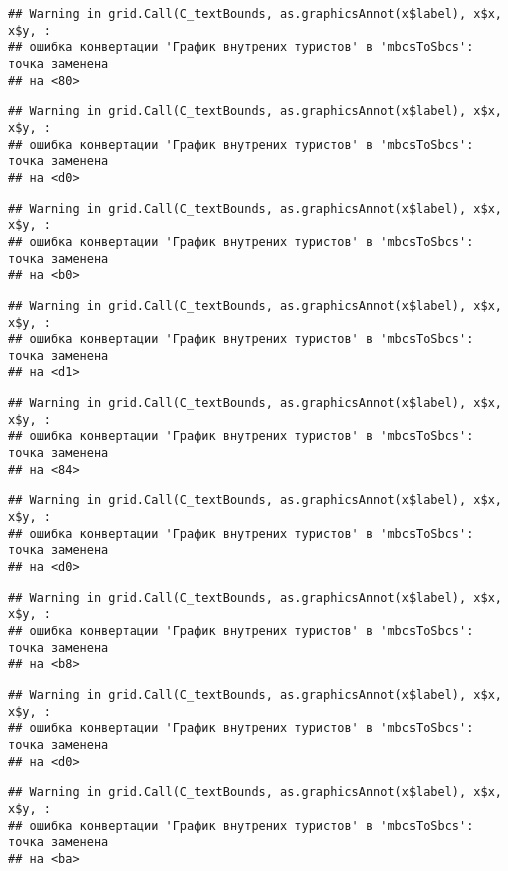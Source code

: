 \documentclass[
]{article}
\begin{document}
\begin{verbatim}
## Warning in grid.Call(C_textBounds, as.graphicsAnnot(x$label), x$x, x$y, :
## ошибка конвертации 'График внутрених туристов' в 'mbcsToSbcs': точка заменена
## на <80>
\end{verbatim}

\begin{verbatim}
## Warning in grid.Call(C_textBounds, as.graphicsAnnot(x$label), x$x, x$y, :
## ошибка конвертации 'График внутрених туристов' в 'mbcsToSbcs': точка заменена
## на <d0>
\end{verbatim}

\begin{verbatim}
## Warning in grid.Call(C_textBounds, as.graphicsAnnot(x$label), x$x, x$y, :
## ошибка конвертации 'График внутрених туристов' в 'mbcsToSbcs': точка заменена
## на <b0>
\end{verbatim}

\begin{verbatim}
## Warning in grid.Call(C_textBounds, as.graphicsAnnot(x$label), x$x, x$y, :
## ошибка конвертации 'График внутрених туристов' в 'mbcsToSbcs': точка заменена
## на <d1>
\end{verbatim}

\begin{verbatim}
## Warning in grid.Call(C_textBounds, as.graphicsAnnot(x$label), x$x, x$y, :
## ошибка конвертации 'График внутрених туристов' в 'mbcsToSbcs': точка заменена
## на <84>
\end{verbatim}

\begin{verbatim}
## Warning in grid.Call(C_textBounds, as.graphicsAnnot(x$label), x$x, x$y, :
## ошибка конвертации 'График внутрених туристов' в 'mbcsToSbcs': точка заменена
## на <d0>
\end{verbatim}

\begin{verbatim}
## Warning in grid.Call(C_textBounds, as.graphicsAnnot(x$label), x$x, x$y, :
## ошибка конвертации 'График внутрених туристов' в 'mbcsToSbcs': точка заменена
## на <b8>
\end{verbatim}

\begin{verbatim}
## Warning in grid.Call(C_textBounds, as.graphicsAnnot(x$label), x$x, x$y, :
## ошибка конвертации 'График внутрених туристов' в 'mbcsToSbcs': точка заменена
## на <d0>
\end{verbatim}

\begin{verbatim}
## Warning in grid.Call(C_textBounds, as.graphicsAnnot(x$label), x$x, x$y, :
## ошибка конвертации 'График внутрених туристов' в 'mbcsToSbcs': точка заменена
## на <ba>
\end{verbatim}
\end{document}
